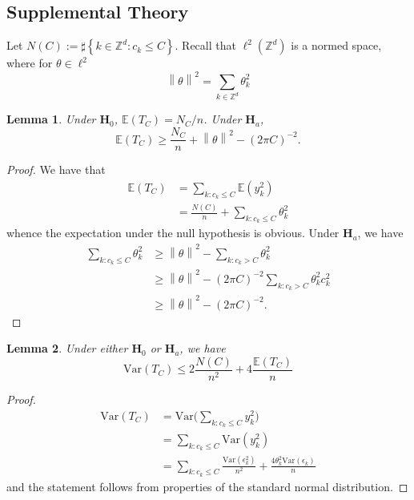 \documentclass{article}
\newcommand{\norm}[1]{\left\lVert#1\right\rVert}
\newcommand{\set}[1]{\left\{#1\right\}}
\newcommand{\Var}{\mathrm{Var}}
\newcommand{\1}{\mathbb{I}}
\newcommand{\Ebb}{\mathbb{E}}
\theoremstyle{alden}
\theoremstyle{aldenthm}
\newtheorem{lemma}{Lemma}
\theoremstyle{definition}
\theoremstyle{remark}
\begin{document}
\subsection{Supplemental Theory}
Let $N(C) := \sharp\set{k \in \mathbb{Z}^d: c_k \leq C}$. Recall that $\ell^2(\mathbb{Z}^d)$ is a normed space, where for $\theta \in \ell^2$
\begin{equation*}
\norm{\theta}^2 = \sum_{k \in \mathbb{Z}^d} \theta_k^2
\end{equation*}
\begin{lemma}
	\label{lem: expectation}
	Under $\mathbf{H}_0$, $\Ebb(T_C) = N_C/n$. Under $\mathbf{H}_a$,
	\begin{equation*}
	\Ebb(T_C) \geq \frac{N_C}{n} + \norm{\theta}^2 - (2\pi C)^{-2}.
	\end{equation*}
\end{lemma}
\begin{proof}
	We have that
	\begin{align*}
	\Ebb(T_C) & = \sum_{k: c_k  \leq C} \Ebb(y_k^2) \\
	& = \frac{N(C)}{n} + \sum_{k:  c_k \leq C} \theta_k^2
	\end{align*}
	whence the expectation under the null hypothesis is obvious. Under $\mathbf{H}_a$, we have
	\begin{align*}
	\sum_{k:  c_k \leq C} \theta_k^2 & \geq \norm{\theta}^2 - \sum_{k:  c_k > C} \theta_k^2 \\
	& \geq \norm{\theta}^2 - (2 \pi C)^{-2} \sum_{k:  c_k > C} \theta_k^2 c_k^2 \\
	& \geq  \norm{\theta}^2 - (2 \pi C)^{-2}.
	\end{align*}
\end{proof}

\begin{lemma}
	\label{lem: var_test_statistic}
	Under either $\mathbf{H}_0$ or $\mathbf{H}_a$, we have
	\begin{equation*}
	\Var(T_C) \leq 2\frac{N(C)}{n^2} + 4\frac{\Ebb(T_C)}{n}
	\end{equation*}
\end{lemma}
\begin{proof}
	\begin{align*}
	\Var(T_C) & = \Var \bigl(\sum_{k: c_k \leq C} y_k^2 \bigr) \\
	& = \sum_{k:  c_k \leq C} \Var(y_k^2) \\
	& = \sum_{k:  c_k \leq C} \frac{\Var(\epsilon_k^2)}{n^2} + \frac{4 \theta_k^2 \Var(\epsilon_k)}{n}
	\end{align*}
	and the statement follows from properties of the standard normal distribution.
\end{proof}
\end{document}

